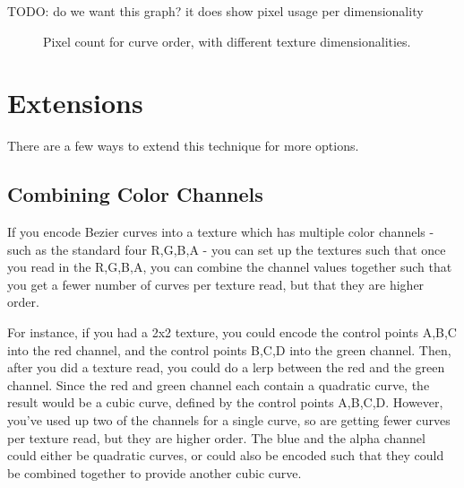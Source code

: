 \documentclass{jcgt}
\begin{document}
TODO: do we want this graph? it does show pixel usage per dimensionality
\begin{figure}

    \caption{Pixel count for curve order, with different texture dimensionalities.}
    \label{fig:decasteljeauBilinear}
  \end{figure}

\section{Extensions}
\label{sec:extensions}

There are a few ways to extend this technique for more options.

\subsection{Combining Color Channels}

If you encode Bezier curves into a texture which has multiple color channels - such as the standard four R,G,B,A - you can set up the textures such that once you read in the R,G,B,A, you can combine the channel values together such that you get a fewer number of curves per texture read, but that they are higher order.

For instance, if you had a 2x2 texture, you could encode the control points A,B,C into the red channel, and the control points B,C,D into the green channel.  Then, after you did a texture read, you could do a lerp between the red and the green channel.  Since the red and green channel each contain a quadratic curve, the result would be a cubic curve, defined by the control points A,B,C,D.  However, you've used up two of the channels for a single curve, so are getting fewer curves per texture read, but they are higher order.  The blue and the alpha channel could either be quadratic curves, or could also be encoded such that they could be combined together to provide another cubic curve.
\end{document}
